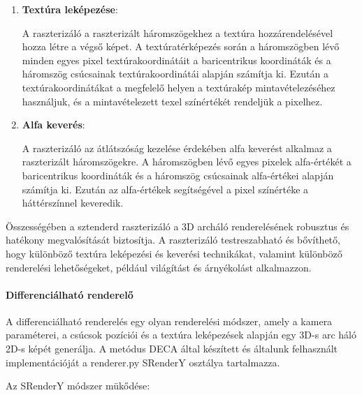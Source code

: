 \documentclass[12pt,a4]{article}
\begin{document}
\begin{enumerate}
                \item \textbf{Textúra leképezése}:
         
                        A raszterizáló a raszterizált háromszögekhez a textúra hozzárendelésével  hozza létre a végső képet. 
                        A textúratérképezés során a háromszögben lévő minden egyes pixel textúrakoordinátáit a baricentrikus koordináták és a háromszög csúcsainak textúrakoordinátái alapján számítja ki.
            	        Ezután a textúrakoordinátákat a megfelelő helyen a textúrakép mintavételezéséhez használjuk, és a mintavételezett texel színértékét rendeljük a pixelhez.
     
                 \item \textbf{Alfa keverés}:
                 
                        A raszterizáló az átlátszóság kezelése érdekében alfa keverést alkalmaz a raszterizált háromszögekre. 
                    	A háromszögben lévő egyes pixelek alfa-értékét a baricentrikus koordináták és a háromszög csúcsainak alfa-értékei alapján számítja ki. 
                    	Ezután az alfa-értékek segítségével a pixel színértéke a háttérszínnel keveredik.
     
            \end{enumerate}
     
             Összességében a sztenderd raszterizáló a 3D archáló renderelésének robusztus és hatékony megvalósítását biztosítja.
             A raszterizáló testreszabható és bővíthető, hogy különböző textúra leképezési és keverési technikákat, valamint különböző renderelési lehetőségeket, például világítást és árnyékolást alkalmazzon.
         
        \paragraph{Differenciálható renderelő}
             A differenciálható renderelés egy olyan renderelési módszer, amely a kamera paraméterei, a csúcsok pozíciói és a textúra leképezések alapján egy 3D-s arc háló 2D-s képét generálja. A metódus DECA \cite{deca} által készített és általunk felhasznált implementációját a renderer.py SRenderY osztálya tartalmazza. 

             Az SRenderY módszer mükődése:
            
\end{document}
